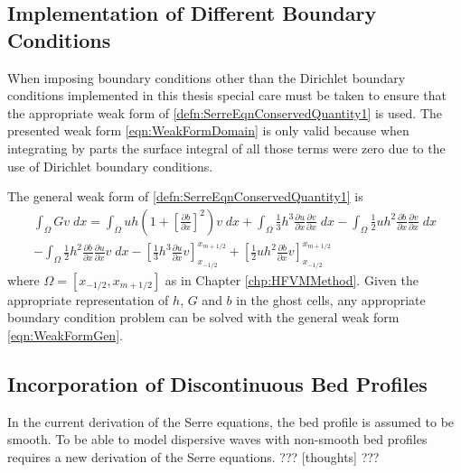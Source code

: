 \subsection{Implementation of Different Boundary Conditions}
When imposing boundary conditions other than the Dirichlet boundary conditions implemented in this thesis special care must be taken to ensure that the appropriate weak form of \eqref{defn:SerreEqnConservedQuantity1} is used. The presented weak form \eqref{eqn:WeakFormDomain} is only valid because when integrating by parts the surface integral of all those terms were zero due to the use of Dirichlet boundary conditions. 

The general weak form of \eqref{defn:SerreEqnConservedQuantity1} is
\begin{multline}
\int_{\Omega } G v \; dx = \int_{\Omega } uh \left(1 + \left[\frac{\partial b}{\partial x}\right]^2 \right) v \; dx +  \int_{\Omega } \frac{1}{3}h^3  \frac{\partial {u}}{\partial x} \frac{\partial v}{\partial x} \; dx - 
\int_{\Omega }   \frac{1}{2} u h^2\frac{\partial b}{\partial x}  \frac{\partial v }{\partial x}\; dx  \\ - 
\int_{\Omega }   \frac{1}{2}h^2\frac{\partial b}{\partial x}  \frac{\partial u }{\partial x}v \; dx  - \left[\frac{1}{3} h^3  \frac{\partial {u}}{\partial x} v\right]_{x_{-1/2}}^{x_{m+1/2}} + \left[\frac{1}{2} uh^2  \frac{\partial {b}}{\partial x} v\right]_{x_{-1/2}}^{x_{m+1/2}}
\label{eqn:WeakFormGen}
\end{multline}
where $\Omega = \left[x_{-1/2},x_{m+1/2}\right]$ as in Chapter \ref{chp:HFVMMethod}. Given the appropriate representation of $h$, $G$ and $b$ in the ghost cells, any appropriate boundary condition problem can be solved with the general weak form \ref{eqn:WeakFormGen}.

\subsection{Incorporation of Discontinuous Bed Profiles}
In the current derivation of the Serre equations, the bed profile is assumed to be smooth. To be able to model dispersive waves with non-smooth bed profiles requires a new derivation of the Serre equations.
??? [thoughts] ???

